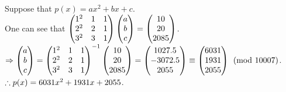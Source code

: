 \begin{pr}
Suppose that $p(x)=ax^2+bx+c$.\\
One can see that $\begin{pmatrix}
1^2&1&1\\
2^2&2&1\\
3^2&3&1
\end{pmatrix}\begin{pmatrix}a\\b\\c\end{pmatrix}=\begin{pmatrix}10\\20\\2085\end{pmatrix}$.\\
$\Rightarrow\begin{pmatrix}a\\b\\c\end{pmatrix}=\begin{pmatrix}
1^2&1&1\\
2^2&2&1\\
3^2&3&1
\end{pmatrix}^{-1}\begin{pmatrix}10\\20\\2085\end{pmatrix}=\begin{pmatrix}1027.5\\-3072.5\\2055\end{pmatrix}\equiv\begin{pmatrix}6031\\1931\\2055\end{pmatrix}\pmod{10007}$.\\
$\therefore p(x)=6031x^2+1931x+2055$.
\end{pr}

